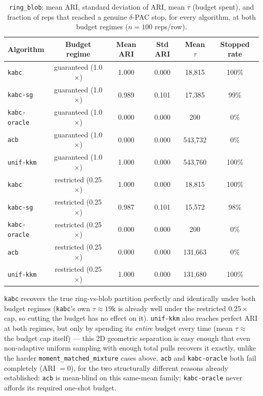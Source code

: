 \documentclass[11pt]{article}
\begin{document}
\begin{table}[h]
\centering
\caption{\texttt{ring\_blob}: mean ARI, standard deviation of ARI, mean
$\tau$ (budget spent), and fraction of reps that reached a genuine
$\delta$-PAC stop, for every algorithm, at both budget regimes ($n=100$
reps/row).}
\begin{tabular}{lccccc}
\toprule
Algorithm & Budget regime & Mean ARI & Std ARI & Mean $\tau$ & Stopped rate \\
\midrule
\texttt{kabc}        & guaranteed (1.0$\times$)  & 1.000 & 0.000 &  18{,}815 & 100\% \\
\texttt{kabc-sg}     & guaranteed (1.0$\times$)  & 0.989 & 0.101 &  17{,}385 &  99\% \\
\texttt{kabc-oracle} & guaranteed (1.0$\times$)  & 0.000 & 0.000 &     200 &   0\% \\
\texttt{acb}         & guaranteed (1.0$\times$)  & 0.000 & 0.000 & 543{,}732 &   0\% \\
\texttt{unif-kkm}    & guaranteed (1.0$\times$)  & 1.000 & 0.000 & 543{,}760 & 100\% \\
\midrule
\texttt{kabc}        & restricted (0.25$\times$) & 1.000 & 0.000 &  18{,}815 & 100\% \\
\texttt{kabc-sg}     & restricted (0.25$\times$) & 0.987 & 0.101 &  15{,}572 &  98\% \\
\texttt{kabc-oracle} & restricted (0.25$\times$) & 0.000 & 0.000 &     200 &   0\% \\
\texttt{acb}         & restricted (0.25$\times$) & 0.000 & 0.000 & 131{,}663 &   0\% \\
\texttt{unif-kkm}    & restricted (0.25$\times$) & 1.000 & 0.000 & 131{,}680 & 100\% \\
\bottomrule
\end{tabular}
\label{tab:exp2-ringblob}
\end{table}

\texttt{kabc} recovers the true ring-vs-blob partition perfectly and
identically under both budget regimes (\texttt{kabc}'s own $\tau\approx19$k
is already well under the restricted $0.25\times$ cap, so cutting the budget
has no effect on it). \texttt{unif-kkm} also reaches perfect ARI at both
regimes, but only by spending its \emph{entire} budget every time (mean
$\tau\approx$ the budget cap itself) --- this 2D geometric separation is easy
enough that even non-adaptive uniform sampling with enough total pulls
recovers it exactly, unlike the harder \texttt{moment\_matched\_mixture}
cases above. \texttt{acb} and \texttt{kabc-oracle} both fail completely (ARI
$=0$), for the two structurally different reasons already established: \texttt{acb} is
mean-blind on this same-mean family; \texttt{kabc-oracle} never affords its
required one-shot budget.
\end{document}
